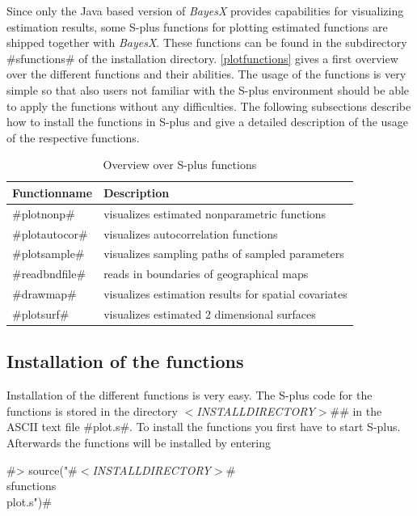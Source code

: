 Since only the Java based version of {\em BayesX} provides
capabilities for visualizing estimation results, some S-plus
functions for plotting estimated functions are shipped together
with {\em BayesX}. These functions can be found in the
subdirectory #sfunctions# of the installation directory.
\autoref{plotfunctions} gives a first overview over the different
functions and their abilities. The usage of the functions is very
simple so that also users not familiar with the S-plus environment
should be able to apply the functions without any difficulties.
The following subsections describe how to install the functions in
S-plus and give a detailed description of the usage of the
respective functions.

\begin{table}[ht]
\begin{center}
\begin{tabular}{|l|l|}
\hline
{\bf Functionname} & {\bf Description} \\
\hline
#plotnonp# & visualizes estimated nonparametric functions \\
#plotautocor# & visualizes autocorrelation functions \\
#plotsample# & visualizes sampling paths of sampled parameters \\
#readbndfile# & reads in boundaries of geographical maps \\
#drawmap# & visualizes estimation results for spatial covariates \\
#plotsurf# & visualizes estimated 2 dimensional surfaces \\
\hline
\end{tabular}
{\em\caption{\label{plotfunctions} Overview over S-plus
functions}}
\end{center}
\end{table}


\subsection{Installation of the functions} 

Installation of the different functions is very easy. The S-plus
code for the functions is stored in the directory {\em
$<$INSTALLDIRECTORY$>$}#\sfunctions# in the ASCII text file
#plot.s#. To install the functions you first have to start S-plus.
Afterwards the functions will be installed by entering

#> source("#{\em $<$INSTALLDIRECTORY$>$}#\\sfunctions\\plot.s")#

